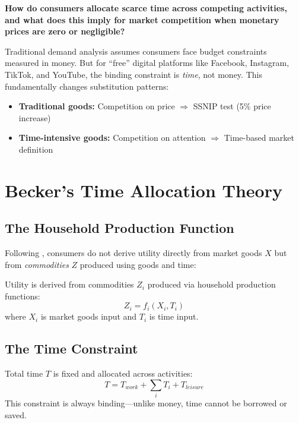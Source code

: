 \begin{tcolorbox}[colback=yellow!10!white, colframe=orange!75!black,
    title=Central Question]
\textbf{How do consumers allocate scarce time across competing activities, and what does this imply for market competition when monetary prices are zero or negligible?}
\end{tcolorbox}

Traditional demand analysis assumes consumers face budget constraints measured in money. But for ``free'' digital platforms like Facebook, Instagram, TikTok, and YouTube, the binding constraint is \textit{time}, not money. This fundamentally changes substitution patterns:

\begin{itemize}
\item \textbf{Traditional goods:} Competition on price $\Rightarrow$ SSNIP test (5\% price increase)
\item \textbf{Time-intensive goods:} Competition on attention $\Rightarrow$ Time-based market definition
\end{itemize}

\section{Becker's Time Allocation Theory}
\label{sec:pt-time-constraint}

\subsection{The Household Production Function}

Following \citet{PAP-becker1965theory}, consumers do not derive utility directly from market goods $X$ but from \textit{commodities} $Z$ produced using goods and time:

\begin{axiom}
\label{ax:ta-household}
Utility is derived from commodities $Z_i$ produced via household production functions:
\[
Z_i = f_i(X_i, T_i)
\]
where $X_i$ is market goods input and $T_i$ is time input.
\end{axiom}

\subsection{The Time Constraint}

\begin{axiom}
\label{ax:ta-time}
Total time $T$ is fixed and allocated across activities:
\[
T = T_{work} + \sum_i T_i + T_{leisure}
\]
This constraint is always binding---unlike money, time cannot be borrowed or saved.
\end{axiom}

